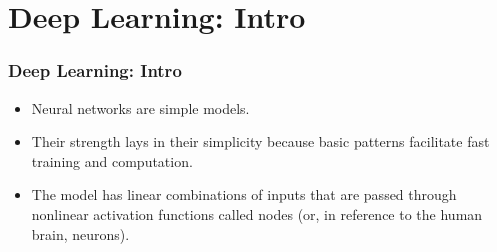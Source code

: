 \documentclass[
  shownotes,
  xcolor={svgnames},
  hyperref={colorlinks,citecolor=DarkBlue,linkcolor=DarkRed,urlcolor=DarkBlue}
  , aspectratio=169]{beamer}
\begin{document}
\section{Deep Learning: Intro}
\begin{frame}
\frametitle{Deep Learning: Intro}
\pause
\begin{itemize}
    
  \item Neural networks are simple models.
  \medskip
  \item Their strength lays in their simplicity because basic patterns facilitate fast training and computation. 
  \medskip
  \item The model has linear combinations of inputs that are passed through nonlinear activation functions called nodes (or, in reference to the human brain, neurons). 
  \medskip
  
\end{itemize}

\end{frame}
\end{document}
